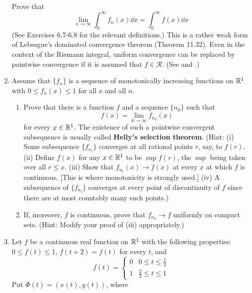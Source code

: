 \documentclass[../psets.tex]{subfiles}
\begin{document}
\begin{enumerate}[label={\textbf{\arabic*.}}]
\begin{equation*}
    \end{equation*}
    Prove that
    \begin{equation*}
        \lim_{n\to\infty}\int_0^\infty f_n(x)\dd{x} = \int_0^\infty f(x)\dd{x}
    \end{equation*}
    (See Exercises 6.7-6.8 for the relevant definitions.) This is a rather weak form of Lebesgue's dominated convergence theorem (Theorem 11.32). Even in the context of the Riemann integral, uniform convergence can be replaced by pointwise convergence if it is assumed that $f\in\mathscr{R}$. (See \textcite{bib:Cunningham} and \textcite{bib:Kestelman}.)
    \item Assume that $\{f_n\}$ is a sequence of monotonically increasing functions on $\mathbb{R}^1$ with $0\leq f_n(x)\leq 1$ for all $x$ and all $n$.
    \begin{enumerate}
        \item Prove that there is a function $f$ and a sequence $\{n_k\}$ such that
        \begin{equation*}
            f(x) = \lim_{k\to\infty}f_{n_k}(x)
        \end{equation*}
        for every $x\in\mathbb{R}^1$. The existence of such a pointwise convergent subsequence is usually called \textbf{Helly's selection theorem}. (Hint: (i) Some subsequence $\{f_{n_i}\}$ converges at all rational points $r$, say, to $f(r)$. (ii) Define $f(x)$ for any $x\in\mathbb{R}^1$ to be $\sup f(r)$, the $\sup$ being taken over all $r\leq x$. (iii) Show that $f_{n_i}(x)\to f(x)$ at every $x$ at which $f$ is continuous. [This is where monotonicity is strongly used.] (iv) A subsequence of $\{f_{n_i}\}$ converges at every point of discontinuity of $f$ since there are at most countably many such points.)
        \item If, moreover, $f$ is continuous, prove that $f_{n_k}\to f$ uniformly on compact sets. (Hint: Modify your proof of (iii) appropriately.)
    \end{enumerate}
    \item Let $f$ be a continuous real function on $\mathbb{R}^1$ with the following properties: $0\leq f(t)\leq 1$, $f(t+2)=f(t)$ for every $t$, and
    \begin{equation*}
        f(t) =
        \begin{cases}
            0 & 0\leq t\leq\frac{1}{3}\\
            1 & \frac{2}{3}\leq t\leq 1
        \end{cases}
    \end{equation*}
    Put $\Phi(t)=(x(t),y(t))$, where

\end{enumerate}
\end{document}
